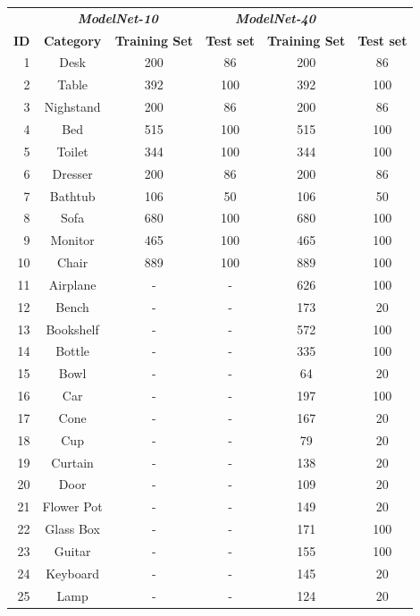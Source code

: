 \begin{table}
    \centering
    \begin{tabular}{rccccc}
    &	\multicolumn{2}{c}{\textbf{\emph{ModelNet-10}}} & \multicolumn{2}{c}{\textbf{\emph{ModelNet-40}}}\\
    \textbf{ID} & \textbf{Category}  & \textbf{Training Set} & \textbf{Test set} & \textbf{Training Set} & \textbf{Test set} \\
    \toprule
    1 & Desk      & 200        & 86		& 200  & 86     \\
    2 & Table     & 392        & 100    & 392  & 100	\\
    3 & Nighstand & 200        & 86     & 200  & 86		\\
    4 & Bed       & 515        & 100    & 515  & 100	\\
    5 & Toilet    & 344        & 100    & 344  & 100	\\
    6 & Dresser   & 200        & 86     & 200  & 86		\\
    7 & Bathtub   & 106        & 50     & 106  & 50		\\
    8 & Sofa      & 680        & 100    & 680  & 100	\\
    9 & Monitor   & 465        & 100    & 465  & 100 	\\
    10 & Chair     & 889        & 100    & 889  & 100	\\
    11 & Airplane  & -	 & -	 & 626	& 100 \\
    12 & Bench	  & -	 & -	 & 173	& 20 \\
    13 & Bookshelf & -	 & -	 & 572	& 100 \\
    14 & Bottle	  & -	 & -	 & 335	& 100 \\
    15 & Bowl	  & -	 & -	 & 64	& 20 \\
    16 & Car		  & -	 & -	 & 197	& 100 \\
    17 & Cone	  & -	 & -	 & 167	& 20 \\
    18 & Cup		  & -	 & -	 & 79	& 20 \\
    19 & Curtain	  & -	 & -	 & 138	& 20 \\
    20 & Door	  & -	 & -	 & 109	& 20 \\
    21 & Flower Pot & -	 & -	 & 149	& 20 \\
    22 & Glass Box & -	 & -	 & 171	& 100 \\
    23 & Guitar	  & -	 & -	 & 155	& 100 \\
    24 & Keyboard  & -	 & -	 & 145	& 20 \\
    25 & Lamp	  & -	 & -	 & 124	& 20 \\

\end{tabular}
\end{table}
